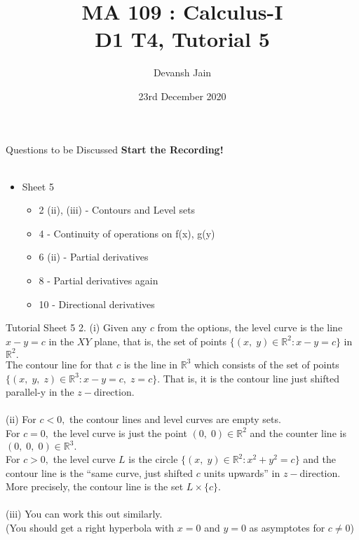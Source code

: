 \documentclass[aspectratio=169]{beamer}
\title{MA 109 : Calculus-I\\ D1 T4, Tutorial 5}
\author{Devansh Jain}
\date[23-12-2020]{23rd December 2020}
\institute[IITB]{IIT Bombay}
\begin{document}
\begin{frame}
    \titlepage
\end{frame}

\begin{frame}{Questions to be Discussed}
    \center\textbf{Start the Recording!} \\~\\
    \begin{itemize}
        \item Sheet 5
            \begin{itemize}
                \item 2 (ii), (iii) - Contours and Level sets
                \item 4 - Continuity of operations on f(x), g(y)
                \item 6 (ii) - Partial derivatives
                \item 8 - Partial derivatives again
                \item 10 - Directional derivatives
            \end{itemize}
    \end{itemize}
\end{frame}

\begin{frame}{Tutorial Sheet 5}
	2. (i) Given any $c$ from the options, the level curve is the line $x - y = c$ in the $XY$ plane, that is, the set of points $\{(x,\;y) \in \mathbb{R}^2 : x - y = c\}$ in $\mathbb{R}^2.$ \\
	The contour line for that $c$ is the line in $\mathbb{R}^3$ which consists of the set of points $\{(x,\;y,\;z)\in\mathbb{R}^3 : x - y = c,\;z = c\}.$ That is, it is the contour line just shifted parallel-y in the $z-$direction. \\~\\
	(ii) For $c < 0,$ the contour lines and level curves are empty sets. \\
	For $c = 0,$ the level curve is just the point $(0,\;0)\in \mathbb{R}^2$ and the counter line is $(0,\;0,\;0)\in \mathbb{R}^3.$ \\
	For $c > 0,$ the level curve $L$ is the circle $\{(x,\;y)\in\mathbb{R}^2:x^2 + y^2 = c\}$ and the contour line is the ``same curve, just shifted $c$ units upwards'' in $z-$direction. More precisely, the contour line is the set $L \times \{c\}.$ \\~\\
	(iii) You can work this out similarly. \\
	(You should get a right hyperbola with $x = 0$ and $y = 0$ as asymptotes for $c \ne 0$) \\
\end{frame}
	
\end{document}

